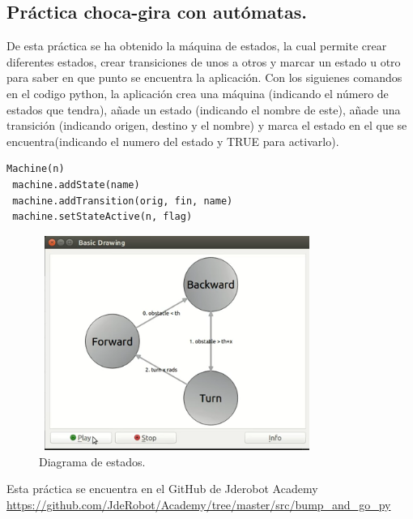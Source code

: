 \subsection{Pr\'actica choca-gira con aut\'omatas.}
\label{sec.JdeRobotAcademy}
\hspace{1 cm} De esta pr\'actica se ha obtenido la m\'aquina de estados, la cual permite crear diferentes estados, crear transiciones de unos a otros y marcar un estado u otro para saber en que punto se encuentra la aplicaci\'on. Con los siguienes comandos en el codigo python, la aplicaci\'on crea una m\'aquina (indicando el n\'umero de estados que tendra), añade un estado (indicando el nombre de este), añade una transici\'on (indicando origen, destino y el nombre) y marca el estado en el que se encuentra(indicando el numero del estado y TRUE para activarlo). 

\begin{lstlisting}[backgroundcolor=\color{yellow}]
 Machine(n)
 machine.addState(name) 
 machine.addTransition(orig, fin, name) 
 machine.setStateActive(n, flag) 
\end{lstlisting}


\begin{figure}[ht]
	\centering
		\includegraphics[width=9cm,height=7cm]{imgs/ChocaGiraAutomata.png}
		\caption{Diagrama de estados.}
	\label{fig:Diag_estados}
\end{figure}

Esta pr\'actica se encuentra en el GitHub de Jderobot Academy  \url{https://github.com/JdeRobot/Academy/tree/master/src/bump_and_go_py}


